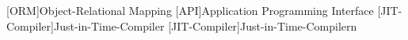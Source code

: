 [ORM]{Object-Relational Mapping}
[API]{Application Programming Interface}
[JIT-Compiler]{Just-in-Time-Compiler}
[JIT-Compiler]{Just-in-Time-Compilern}